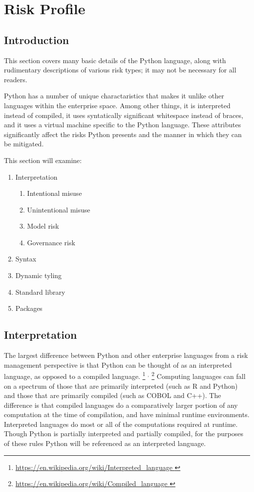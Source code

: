\section{Risk Profile}

	\subsection{Introduction}

		\begin{tcolorbox}
			This section covers many basic details of the Python language, along with rudimentary descriptions of various risk types; it may not be necessary for all readers.
		\end{tcolorbox}

		Python has a number of unique charactaristics that makes it unlike other languages within the enterprise space. Among other things, it is interpreted instead of compiled, it uses syntatically significant whitespace instead of braces, and it uses a virtual machine specific to the Python language. These attributes significantly affect the risks Python presents and the manner in which they can be mitigated.

		This section will examine:

		\begin{enumerate}
   			\item Interpretation
   			\begin{enumerate}
	   			\item Intentional misuse
	   			\item Unintentional misuse
	   			\item Model risk
	   			\item Governance risk
   			\end{enumerate}
   			\item Syntax
   			\item Dynamic tyling
   			\item Standard library
   			\item Packages
		\end{enumerate}

	\subsection{Interpretation}
		The largest difference between Python and other enterprise languages from a risk management perspective is that Python can be thought of as an interpreted language, as opposed to a compiled language.
		\footnote{
			\url{
				https://en.wikipedia.org/wiki/Interpreted_language
			}
		}
		$^{,}$
		\footnote{
			\url{
				https://en.wikipedia.org/wiki/Compiled_language
			}
		}
		Computing languages can fall on a spectrum of those that are primarily interpreted (such as R and Python) and those that are primarily compiled (such as COBOL and C++). The difference is that compiled languages do a comparatively larger portion of any computation at the time of compilation, and have minimal runtime environments. Interpreted languages do most or all of the computations required at runtime. Though Python is partially interpreted and partially compiled, for the purposes of these rules Python will be referenced as an interpreted language.

